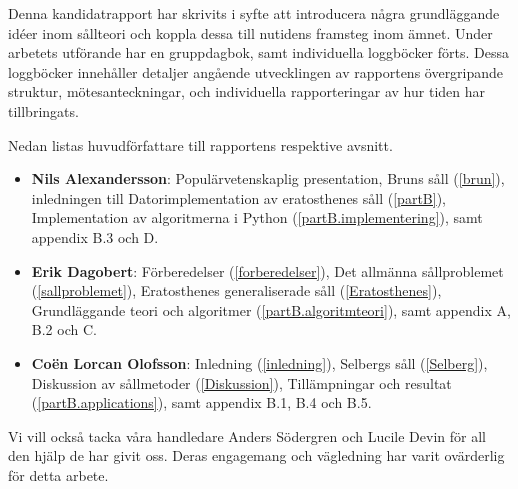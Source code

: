 Denna kandidatrapport har skrivits i syfte att introducera några grundläggande idéer inom sållteori och koppla dessa till nutidens framsteg inom ämnet.
Under arbetets utförande har en gruppdagbok, samt individuella loggböcker förts.
Dessa loggböcker innehåller detaljer angående utvecklingen av rapportens övergripande struktur, mötesanteckningar, och individuella rapporteringar av hur tiden har tillbringats.

Nedan listas huvudförfattare till rapportens respektive avsnitt.
\begin{itemize}
    \item \textbf{Nils Alexandersson}: 
        Populärvetenskaplig presentation,
        Bruns såll (\ref{brun}),
        inledningen till Datorimplementation av eratosthenes såll (\ref{partB}),
        Implementation av algoritmerna i Python (\ref{partB.implementering}),
        samt appendix B.3 och D.
    \item \textbf{Erik Dagobert}: 
        Förberedelser (\ref{forberedelser}), 
        Det allmänna sållproblemet (\ref{sallproblemet}), 
        Eratosthenes generaliserade såll (\ref{Eratosthenes}),
        Grundläggande teori och algoritmer (\ref{partB.algoritmteori}),
        samt appendix A, B.2 och C.
    \item \textbf{Coën Lorcan Olofsson}:
        Inledning (\ref{inledning}), 
        Selbergs såll (\ref{Selberg}),
        Diskussion av sållmetoder (\ref{Diskussion}),
        Tillämpningar och resultat (\ref{partB.applications}),
        samt appendix B.1, B.4 och B.5.
\end{itemize}
Vi vill också tacka våra handledare Anders Södergren och Lucile Devin för all den hjälp de har givit oss. 
Deras engagemang och vägledning har varit ovärderlig för detta arbete.